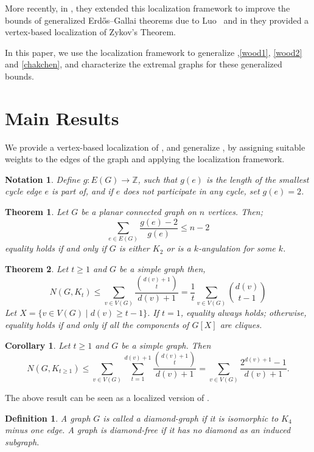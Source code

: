 \documentclass[pdflatex,sn-basic,Numbered]{sn-jnl}
\newtheorem{theorem}{Theorem}
\newtheorem{corollary}{Corollary}
\newtheorem{definition}{Definition}
\newtheorem{notation}{Notation}
\begin{document}
More recently, in \cite{adak2025vertexbasedlocalizationgeneralizedturan}, they extended this localization framework to improve the bounds of generalized Erd\H{o}s--Gallai theorems due to Luo~\cite{luo2018maximum} and in \cite{adak2025generalizedzykovstheorem} they provided a vertex-based localization of Zykov's Theorem.

In this paper, we use the localization framework to generalize ,\ref{wood1}, \ref{wood2} and \ref{chakchen}, and characterize the extremal graphs for these generalized bounds.

\section{Main Results}
We provide a vertex-based localization of , and generalize , by assigning suitable weights to the edges of the graph and applying the localization framework.
\begin{notation}
    Define $g:E(G)\rightarrow \mathbb{Z}$, such that $g(e)$ is the length of the smallest cycle edge $e$ is part of, and if $e$ does not participate in any cycle, set $g(e) =2$.
\end{notation}

\begin{theorem}\label{girthlocal}
    Let $G$ be a planar connected graph on $n$ vertices. Then;
    \[\sum_{e \in E(G)}\frac{g(e)-2}{g(e)} \leq n-2\]
    equality holds if and only if $G$ is either $K_2$ or is a $k$-angulation for some $k$.
\end{theorem}
\begin{theorem}\label{thm2}
    Let $t \geq 1$ and $G$ be a simple graph then, 
    \[ N(G,K_t) \leq \sum_{v \in V(G)} \frac{{d(v)+1 \choose t}}{d(v)+1} = \frac{1}{t}\sum_{v \in V(G)}{d(v) \choose t-1}\]
    Let $X = \{v \in V(G) \mid d(v) \geq t-1\}$. If $t =1$, equality always holds; otherwise, equality holds if and only if all the components of $G[X]$ are cliques.
\end{theorem}
\begin{corollary}\label{woodcor1}
    Let $t \geq 1$ and $G$ be a simple graph. Then  
    \[
        N(G,K_{t \geq 1}) \leq \sum_{v \in V(G)}\sum_{t =1}^{d(v)+1}\frac{{d(v)+1 \choose t}}{d(v) +1} 
        = \sum_{v \in V(G)}\frac{2^{d(v)+1} -1}{d(v)+1}.
    \]
\end{corollary}
The above result can be seen as a localized version of .
\begin{definition}
        A graph $G$ is called a \textit{diamond-graph} if it is isomorphic to $K_4$ minus one edge. A graph is \textit{diamond-free} if it has no diamond as an induced subgraph.
\end{definition}
\end{document}
